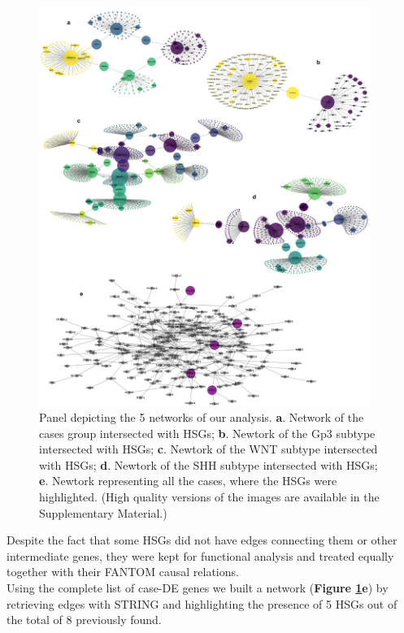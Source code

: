 \documentclass[10pt]{SelfArx} %
\begin{document}
\begin{figure}[h!]
    \centering
    \includegraphics[width=0.96\textwidth]{project-report/figures/network_panel2.png}
    \caption{Panel depicting the 5 networks of our analysis. \textbf{a}. Network of the cases group intersected with HSGs; \textbf{b}. Newtork of the Gp3 subtype intersected with HSGs; \textbf{c}. Newtork of the WNT subtype intersected with HSGs; \textbf{d}. Newtork of the SHH subtype intersected with HSGs; \textbf{e}. Newtork representing all the cases, where the HSGs were highlighted. (High quality versions of the images are available in the Supplementary Material.)}
    \label{fig:network_panel}    
\end{figure}

Despite the fact that some HSGs did not have edges connecting them or other intermediate genes, they were kept for functional analysis and treated equally together with their FANTOM \cite{fantom5} causal relations.\\
Using the complete list of case-DE genes we built a network (\textbf{Figure \ref{fig:network_panel}e}) by retrieving edges with STRING \cite{szklarczyk2019string} and highlighting the presence of 5 HSGs out of the total of 8 previously found.
\end{document}
